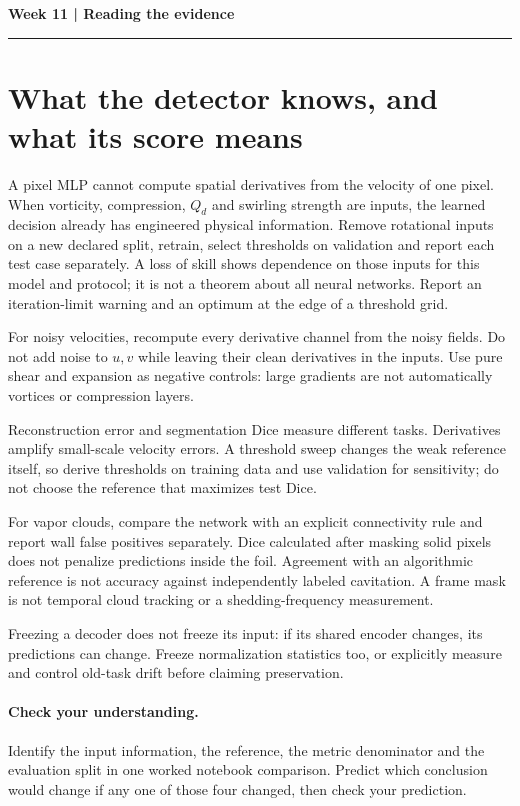 \documentclass[11pt]{article}
\begin{document}
\noindent\textbf{Week 11 | Reading the evidence}\par\medskip\hrule\medskip
\section*{What the detector knows, and what its score means}
A pixel MLP cannot compute spatial derivatives from the velocity of one pixel.
When vorticity, compression, $Q_d$ and swirling strength are inputs, the learned
decision already has engineered physical information. Remove rotational inputs
on a new declared split, retrain, select thresholds on validation and report each
test case separately. A loss of skill shows dependence on those inputs for this
model and protocol; it is not a theorem about all neural networks. Report an
iteration-limit warning and an optimum at the edge of a threshold grid.

For noisy velocities, recompute every derivative channel from the noisy fields.
Do not add noise to $u,v$ while leaving their clean derivatives in the inputs.
Use pure shear and expansion as negative controls: large gradients are not
automatically vortices or compression layers.

Reconstruction error and segmentation Dice measure different tasks. Derivatives
amplify small-scale velocity errors. A threshold sweep changes the weak reference
itself, so derive thresholds on training data and use validation for sensitivity;
do not choose the reference that maximizes test Dice.

For vapor clouds, compare the network with an explicit connectivity rule and
report wall false positives separately. Dice calculated after masking solid
pixels does not penalize predictions inside the foil. Agreement with an
algorithmic reference is not accuracy against independently labeled cavitation.
A frame mask is not temporal cloud tracking or a shedding-frequency measurement.

Freezing a decoder does not freeze its input: if its shared encoder changes,
its predictions can change. Freeze normalization statistics too, or explicitly
measure and control old-task drift before claiming preservation.
\paragraph{Check your understanding.}
Identify the input information, the reference, the metric denominator and the
evaluation split in one worked notebook comparison. Predict which conclusion
would change if any one of those four changed, then check your prediction.
\end{document}

